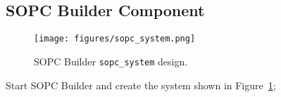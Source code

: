 \documentclass[10pt,twoside]{article}
\begin{document}
\clearpage
\subsection{SOPC Builder Component}
%
\begin{figure}[t]
  \begin{center}
    \texttt{[image: figures/sopc\_system.png]}
  \end{center}
  \caption{SOPC Builder {\tt sopc\_system} design.}
  \label{fig:sopc_system}
\end{figure}

Start SOPC Builder and create the system shown in Figure~\ref{fig:sopc_system};
%
\end{document}
